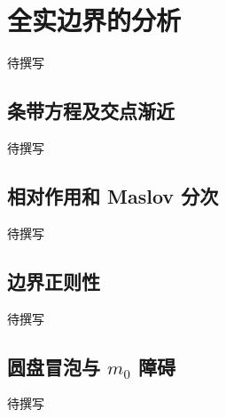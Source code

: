 
% 
% 

\section{全实边界的分析}
\label{g4:sec:2801}

待撰写

\subsection{条带方程及交点渐近}
\label{g4:subsec:2801:01}
待撰写

\subsection{相对作用和 Maslov 分次}
\label{g4:subsec:2801:02}
待撰写

\subsection{边界正则性}
\label{g4:subsec:2801:03}
待撰写

\subsection{\texorpdfstring{圆盘冒泡与 \(m_0\) 障碍}{圆盘冒泡与 m₀ 障碍}}
\label{g4:subsec:2801:04}
待撰写
